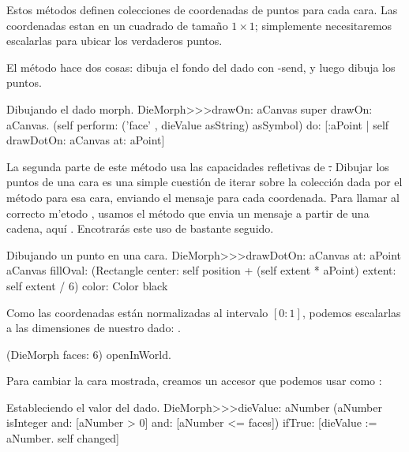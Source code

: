 \documentclass[a4paper,10pt,twoside]{book}
\begin{document}
Estos m\'etodos definen colecciones de coordenadas de puntos para cada cara. Las coordenadas estan en un cuadrado de tama\~no $1\times1$; simplemente necesitaremos escalarlas para ubicar los verdaderos puntos.

El m\'etodo  hace dos cosas: dibuja el fondo del dado con -send, y luego dibuja los puntos.
\begin{method}{Dibujando el dado morph.}
DieMorph>>>drawOn: aCanvas
	super drawOn: aCanvas.
	(self perform: ('face' , dieValue asString) asSymbol)
		do: [:aPoint | self drawDotOn: aCanvas at: aPoint]
\end{method}

La segunda parte de este m\'etodo usa las capacidades refletivas de \st.
Dibujar los puntos de una cara es una simple cuesti\'on de iterar sobre la colecci\'on dada por el m\'etodo  para esa cara, enviando el mensaje  para cada coordenada. Para llamar al correcto m'etodo , usamos el m\'etodo  que envia un mensaje a partir de una cadena, aqu\'i . Encotrar\'as este uso de  bastante seguido.
\begin{method}{Dibujando un punto en una cara.}
DieMorph>>>drawDotOn: aCanvas at: aPoint
	aCanvas
		fillOval: (Rectangle
			center: self position + (self extent * aPoint)
			extent: self extent / 6)
		color: Color black
\end{method}

Como las coordenadas est\'an normalizadas al intervalo $[0{:}1]$, podemos escalarlas a las dimensiones de nuestro dado: .

\begin{code}{}
(DieMorph faces: 6) openInWorld.
\end{code}

Para cambiar la cara mostrada, creamos un accesor que podemos usar como :
\begin{method}{Estableciendo el valor del dado.}
DieMorph>>>dieValue: aNumber
	(aNumber isInteger
			and: [aNumber > 0]
			and: [aNumber <= faces])
		ifTrue:
			[dieValue := aNumber.
			self changed]
\end{method}
\end{document}
